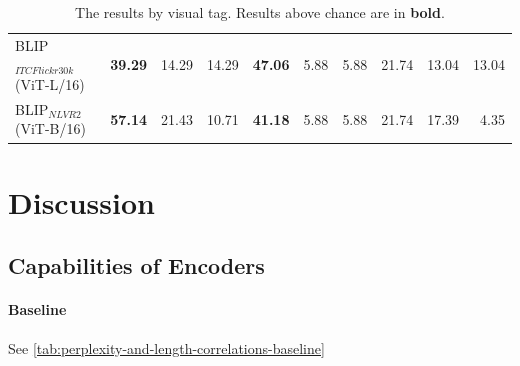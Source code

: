\begin{table}[ht]
\begin{adjustbox}{max width=\textwidth}
\begin{tabular}{l|rrr|rrr|rrr}
 BLIP$_{ITC Flickr30k}$ (ViT-L/16)   & \textbf{39.29} & 14.29          & 14.29          & \textbf{47.06} & 5.88           & 5.88           & 21.74          & 13.04          & 13.04          \\
 BLIP$_{NLVR2}$ (ViT-B/16)           & \textbf{57.14} & 21.43          & 10.71          & \textbf{41.18} & 5.88           & 5.88           & 21.74          & 17.39          & 4.35           \\
\bottomrule
\end{tabular}
  \end{adjustbox}
  \caption{The results by visual tag. Results above chance are in \textbf{bold}.}
    \label{tab:results-by-visual-tag-ours}
\end{table}

\section{Discussion} \label{sec:winoground_disussion}

\subsection{Capabilities of Encoders}

\paragraph{Baseline}

See \cref{tab:perplexity-and-length-correlations-baseline}

